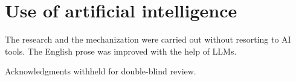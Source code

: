 \documentclass[sigplan,10pt,anonymous,review]{acmart}
\begin{document}
\section*{Use of artificial intelligence}

The research and the mechanization were carried out without resorting to AI
tools. The English prose was improved with the help of LLMs.

\begin{acks}
  Acknowledgments withheld for double-blind review.
\end{acks}






 \newpage



\end{document}
